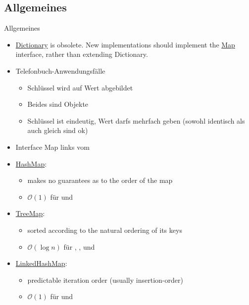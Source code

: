 \documentclass[usepdftitle=false,hyperref={pdfpagelabels=false}]{beamer}
\begin{document}
\subsection{Allgemeines}
\begin{frame}{Allgemeines}
    \begin{itemize}[<+->]
        \item \href{http://docs.oracle.com/javase/7/docs/api/java/util/Dictionary.html}{Dictionary}
              is obsolete. New implementations should implement the
              \href{http://docs.oracle.com/javase/7/docs/api/java/util/Map.html}{Map}
              interface, rather than extending Dictionary.
        \item Telefonbuch-Anwendungsfälle
            \begin{itemize}
                \item Schlüssel wird auf Wert abgebildet
                \item Beides sind Objekte
                \item Schlüssel ist eindeutig, Wert darfs mehrfach geben (sowohl identisch als auch gleich sind ok)
            \end{itemize}
        \item Interface Map links vom \myCode{=}
        \item \href{http://docs.oracle.com/javase/7/docs/api/java/util/HashMap.html}{HashMap}:
            \begin{itemize}
                \item makes no guarantees as to the order of the map
                \item $\mathcal{O}(1)$ für  und 
            \end{itemize}
        \item \href{http://docs.oracle.com/javase/7/docs/api/java/util/TreeMap.html}{TreeMap}:
            \begin{itemize}
                \item sorted according to the natural ordering of its keys
                \item $\mathcal{O}(\log n)$ für , ,  und 
            \end{itemize}
        \item \href{http://docs.oracle.com/javase/7/docs/api/java/util/LinkedHashMap.html}{LinkedHashMap}:
            \begin{itemize}
                \item predictable iteration order (usually insertion-order)
                \item $\mathcal{O}(1)$ für  und 
            \end{itemize}
    \end{itemize}
\end{frame}
\end{document}
